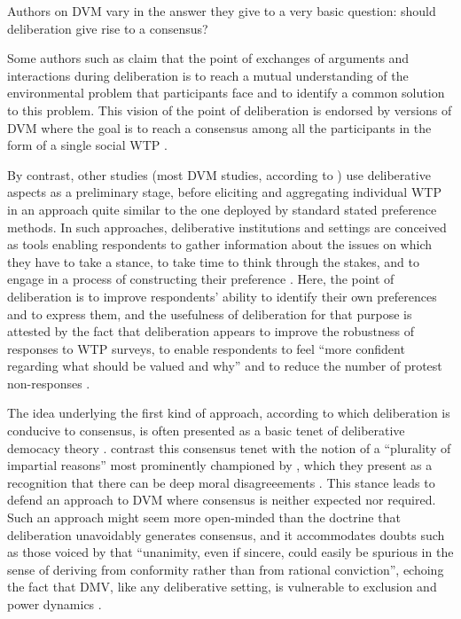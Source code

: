 \documentclass[version=3.21, pagesize, twoside=off, bibliography=totoc, DIV=calc, fontsize=12pt, a4paper, french, english]{scrartcl}
\begin{document}
Authors on DVM vary in the answer they give to a very basic question: should deliberation give rise to a consensus?

Some authors such as \citet{vatn_institutional_2009} claim that the point of exchanges of arguments and interactions during deliberation is to reach a mutual understanding of the environmental problem that participants face and to identify a common solution to this problem. This vision of the point of deliberation is endorsed by versions of DVM where the goal is to reach a consensus among all the participants in the form of a single social WTP \citep{orchard-webb_deliberative_2016}.

By contrast, other studies (most DVM studies, according to \citet{bunse_what_2015}) use deliberative aspects as a preliminary stage, before eliciting and aggregating individual WTP in an approach quite similar to the one deployed by standard stated preference methods. In such approaches, deliberative institutions and settings are conceived as tools enabling respondents to gather information about the issues on which they have to take a stance, to take time to think through the stakes, and to engage in a process of constructing their preference \citep{braga_preference_2005}. Here, the point of deliberation is to improve respondents' ability to identify their own preferences and to express them, and the usefulness of deliberation for that purpose is attested by the fact that deliberation appears to improve the robustness of responses to WTP surveys, to enable respondents to feel ``more confident regarding what should be valued and why'' \citep[p. 125, cited by \citet{bartkowski_beyond_2018}]{svedsater_economic_2003} and to reduce the number of protest non-responses \citep{szabo_reducing_2011}.

The idea underlying the first kind of approach, according to which deliberation is conducive to consensus, is often presented as a basic tenet of deliberative democacy theory \citep{wilson_discourse-based_2002}. \citet{bartkowski_beyond_2018} contrast this consensus tenet with the notion of a ``plurality of impartial reasons'' most prominently championed by \citet{sen_idea_2009}, which they present as a recognition that there can be deep moral disagreeements \citep{dryzek_deliberative_2013}. This stance leads \citet{bartkowski_beyond_2018} to defend an approach to DVM where consensus is neither expected nor required. Such an approach might seem more open-minded than the doctrine that deliberation unavoidably generates consensus, and it accommodates doubts such as those voiced by \citet{elster_sour_1983} that ``unanimity, even if sincere, could easily be spurious in the sense of deriving from conformity rather than from rational conviction'', echoing the fact that DMV, like any deliberative setting, is vulnerable to exclusion and power dynamics \citep{volker_exploring_2016,vargas_background_2016,vargas_problem_2017}.
\end{document}
